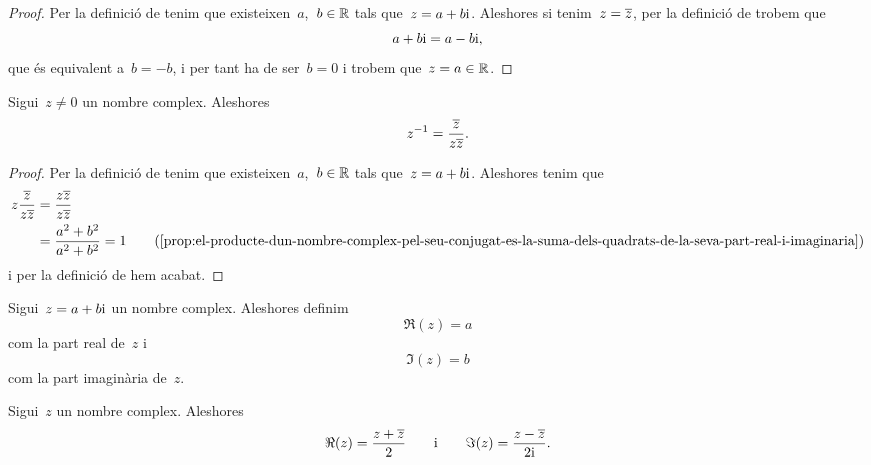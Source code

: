 \documentclass[../analisi-complexa.tex]{subfiles}
\begin{document}
    \begin{proof}
        Per la definició de  tenim que
        existeixen~\(a\),~\(b\in\mathbb{R}\) tals que~\(z = a+b\mathrm{i}\).
        Aleshores si tenim~\(z = \overline{z}\), per la definició
        de  trobem que
        \[
            a+b\mathrm{i} = a-b\mathrm{i},
        \]
        que és equivalent a~\(b = -b\), i per tant ha de ser~\(b = 0\) i
        trobem que~\(z = a\in\mathbb{R}\).
    \end{proof}
    \begin{proposition}
        \label{prop:inversa-dun-nombre-complex-en-funcio-del-seu-conjugat}
        Sigui~\(z \neq 0\) un nombre complex.
        Aleshores
        \[
            z^{-1} = \frac{\overline{z}}{z\overline{z}}.
        \]
    \end{proposition}
    \begin{proof}
        Per la definició de  tenim que
        existeixen~\(a\),~\(b\in\mathbb{R}\) tals que~\(z = a+b\mathrm{i}\).
        Aleshores tenim que
        \begin{align*}
            z\frac{\conjugat{z}}{z\conjugat{z}}
                &= \frac{z\conjugat{z}}{z\conjugat{z}} \\
                &= \frac{a^{2}+b^{2}}{a^{2}+b^{2}} = 1
                \tag{\ref{prop:el-producte-dun-nombre-complex-pel-seu-conjugat-es-la-suma-dels-quadrats-de-la-seva-part-real-i-imaginaria}}
        \end{align*}
        i per la definició de 
        hem acabat.
    \end{proof}
    \begin{definition}
        \label{def:part-real-i-part-imaginaria-dun-nombre-complex}
        \label{def:part-real-dun-nombre-complex}
        \label{def:part-imaginaria-dun-nombre-complex}
        Sigui~\(z = a+b\mathrm{i}\) un nombre complex.
        Aleshores definim
        \[
            \Re(z) = a
        \]
        com la part real de~\(z\) i
        \[
            \Im(z) = b
        \]
        com la part imaginària de~\(z\).
    \end{definition}
    \begin{proposition}
        \label{prop:formules-per-la-part-real-i-part-imaginaria-dun-nombre-complex}
        \label{prop:formula-per-la-part-real-dun-nombre-complex}
        \label{prop:formula-per-la-part-imaginaria-dun-nombre-complex}
        Sigui~\(z\) un nombre complex.
        Aleshores
        \[
            \Re(z) = \frac{z+\overline{z}}{2}\qquad\text{i}\qquad\Im(z)
                   = \frac{z-\overline{z}}{2\mathrm{i}}.
        \]
    \end{proposition}
\end{document}
